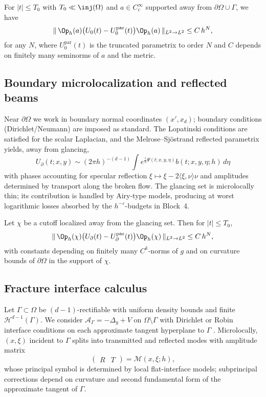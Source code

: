 \begin{lemma}
\label{lem:interior-wave}
For $|t|\le T_0$ with $T_0\ll \inj(\Omega)$ and $a\in C_c^\infty$ supported away from $\partial\Omega\cup\Gamma$, we have
\[
\|\,\Op_h(a)\big( U_0(t) - U^{\mathrm{par}}_0(t) \big)\Op_h(a)\,\|_{L^2\to L^2}
\le C\, h^N,
\]
for any $N$, where $U^{\mathrm{par}}_0(t)$ is the truncated parametrix to order $N$ and $C$ depends on finitely many seminorms of $a$ and the metric.
\end{lemma}

\subsection{Boundary microlocalization and reflected beams}
\label{subsec:boundary-parametrix}
Near $\partial\Omega$ we work in boundary normal coordinates $(x',x_d)$; boundary conditions (Dirichlet/Neumann) are imposed as standard. The Lopatinski conditions are satisfied for the scalar Laplacian, and the Melrose--Sjöstrand reflected parametrix \cite{MelroseSjostrand,SafarovVassiliev} yields, away from glancing,
\[
U_{\partial}(t;x,y) \sim (2\pi h)^{-(d-1)}\int e^{\frac{i}{h}\Psi(t;x,y,\eta)} b(t;x,y,\eta;h)\,d\eta
\]
with phases accounting for specular reflection $\xi\mapsto \xi-2\langle\xi,\nu\rangle \nu$ and amplitudes determined by transport along the broken flow. The glancing set is microlocally thin; its contribution is handled by Airy-type models, producing at worst logarithmic losses absorbed by the $h^{-\varepsilon}$-budgets in Block~4.

\begin{proposition}
\label{prop:boundary-remainder}
Let $\chi$ be a cutoff localized away from the glancing set. Then for $|t|\le T_0$,
\[
\|\,\Op_h(\chi)\big( U_{\partial}(t)- U^{\mathrm{par}}_{\partial}(t)\big)\Op_h(\chi)\,\|_{L^2\to L^2}\le C\, h^N,
\]
with constants depending on finitely many $C^k$-norms of $g$ and on curvature bounds of $\partial\Omega$ in the support of $\chi$.
\end{proposition}

\subsection{Fracture interface calculus}
\label{subsec:fracture-interface}
Let $\Gamma\subset \Omega$ be $(d-1)$-rectifiable with uniform density bounds and finite $\mathcal{H}^{d-1}(\Gamma)$. We consider $\mathcal{A}_\Gamma=-\Delta_g+V$ on $\Omega\setminus\Gamma$ with Dirichlet or Robin interface conditions on each approximate tangent hyperplane to $\Gamma$ \cite{LeRousseauLebeau,Grisvard}. Microlocally, $(x,\xi)$ incident to $\Gamma$ splits into transmitted and reflected modes with amplitude matrix
\[
\begin{pmatrix} R & T\end{pmatrix} = \mathcal{M}(x,\xi;h),
\]
whose principal symbol is determined by local flat-interface models; subprincipal corrections depend on curvature and second fundamental form of the approximate tangent of $\Gamma$.

